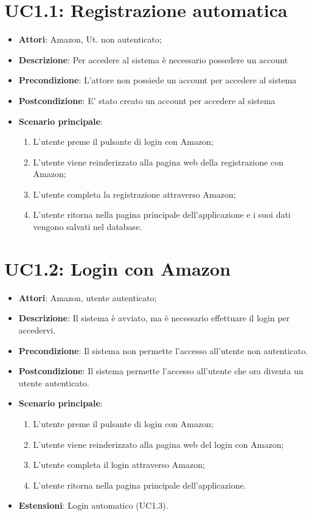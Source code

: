 \section{UC1.1: Registrazione automatica}
\label{UC1.1}
\begin{itemize}
	\item \textbf{Attori}: Amazon, Ut. non autenticato;
	\item \textbf{Descrizione}: Per accedere al sistema è necessario possedere un account
	\item \textbf{Precondizione}: L'attore non possiede un account per accedere al sistema
	\item \textbf{Postcondizione}: E' stato creato un account per accedere al sistema
	\item \textbf{Scenario principale}:
	\begin{enumerate} \item L'utente preme il pulsante di login con Amazon;  \item  L'utente viene reinderizzato alla pagina web della registrazione con Amazon;  \item 
		L'utente completa la registrazione attraverso Amazon;  \item  L'utente ritorna nella pagina principale dell'applicazione e i suoi dati vengono salvati nel database.\end{enumerate}
\end{itemize}

\section{UC1.2: Login con Amazon}
\label{UC1.2}
\begin{itemize}
	\item \textbf{Attori}: Amazon, utente autenticato;
	\item \textbf{Descrizione}: Il sistema è avviato, ma è necessario effettuare il login per accedervi.
	\item \textbf{Precondizione}: Il sistema non permette l'accesso all'utente non autenticato.
	\item \textbf{Postcondizione}: Il sistema permette l'accesso all'utente che ora diventa un utente autenticato.
	\item \textbf{Scenario principale}:
	\begin{enumerate} \item L'utente preme il pulsante di login con Amazon;  \item  L'utente viene reinderizzato alla pagina web del login con Amazon;  \item 
		L'utente completa il login attraverso Amazon;  \item  L'utente ritorna nella pagina principale dell'applicazione.\end{enumerate}
	\item \textbf{Estensioni}:
	Login automatico (UC1.3).
\end{itemize}

